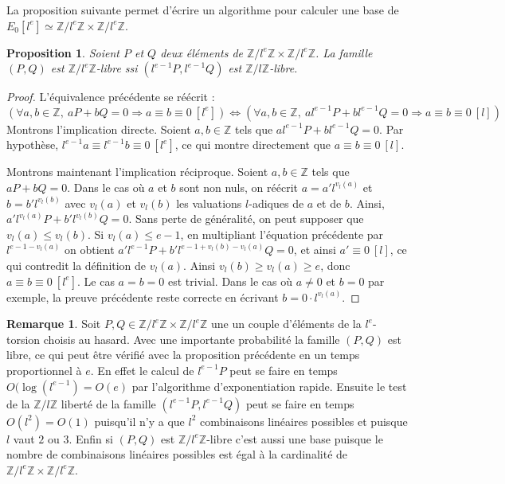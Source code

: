 \documentclass{article}
\theoremstyle{plain}%
\newtheorem{prop}[thm]{Proposition}
\theoremstyle{definition}%
\newtheorem{rem}[thm]{Remarque}
\newcommand{\Z}{\mathbb{Z}}
\begin{document}
La proposition suivante permet d'écrire un algorithme pour calculer une base de 
  $E_0[l^e] \simeq \Z/l^e\Z \times \Z/l^e\Z$.

\begin{prop}
  Soient $P$ et $Q$ deux éléments de $\Z/l^e\Z \times \Z/l^e\Z$. 
  La famille $(P, Q)$ est $\Z/l^e\Z $-libre ssi $(l^{e-1}P, l^{e-1}Q)$ est $\Z/l\Z $-libre. 
\end{prop}

\begin{proof}
  L'équivalence précédente se réécrit :
  $$\left( \forall a, b \in \Z,\ aP + bQ = 0 \Rightarrow a \equiv b \equiv 0\ [l^e] \right) \iff \left( \forall a, b \in \Z,\ a l^{e-1}P + b l^{e-1}Q = 0 \Rightarrow a \equiv b \equiv 0\ [l] \right) $$
  Montrons l'implication directe. Soient $a, b\in \Z$ tels que $a l^{e-1}P + b l^{e-1}Q = 0$. 
  Par hypothèse, $l^{e-1}a \equiv l^{e-1}b \equiv 0\ [l^e]$, ce qui montre directement que $a \equiv b \equiv 0\ [l]$. 

  Montrons maintenant l'implication réciproque. Soient $a, b \in \Z$ tels que $aP + bQ = 0$. 
  Dans le cas où $a$ et $b$ sont non nuls, on réécrit $a = a' l^{v_l(a)}$ et $b = b' l^{v_l(b)}$ avec $v_l(a)$ et $v_l(b)$ les valuations $l$-adiques de $a$ et de $b$. 
  Ainsi, $a' l^{v_l(a)}P + b' l^{v_l(b)}Q = 0$. 
  Sans perte de généralité, on peut supposer que $v_l(a) \le v_l(b)$. 
  Si $v_l(a) \le e-1$, en multipliant l'équation précédente par $l^{e-1-v_l(a)}$ on obtient $a' l^{e-1}P + b' l^{e-1 + v_l(b) - v_l(a)}Q = 0$, et ainsi $a' \equiv 0\ [l]$, ce qui contredit la définition de $v_l(a)$. 
  Ainsi $v_l(b) \ge v_l(a) \ge e$, donc $a \equiv b \equiv 0\ [l^e]$. Le cas $a=b=0$ est trivial. Dans le cas où $a\neq0$ et $b=0$ par exemple, la preuve précédente reste correcte en écrivant $b = 0\cdot l^{v_l(a)}$.
\end{proof}

\begin{rem}
  Soit $P, Q\in \Z/l^e\Z \times \Z/l^e\Z$ une un couple d'éléments de la $l^e$-torsion choisis au hasard. Avec une importante probabilité la famille $(P, Q)$ est libre, ce qui peut être vérifié avec la proposition précédente en un temps proportionnel à $e$. En effet le calcul de $l^{e-1}P$ peut se faire en temps $O(\log(l^{e-1}) = O(e)$ par l'algorithme d'exponentiation rapide. Ensuite le test de la $\Z/l\Z$ liberté de la famille $(l^{e-1}P, l^{e-1}Q)$ peut se faire en temps $O(l^2) = O(1)$ puisqu'il n'y a que $l^2$ combinaisons linéaires possibles et puisque $l$ vaut $2$ ou $3$. Enfin si $(P, Q)$ est $\Z/l^e\Z$-libre c'est aussi une base puisque le nombre de combinaisons linéaires possibles est égal à la cardinalité de $\Z/l^e\Z \times \Z/l^e\Z$.
\end{rem}
\end{document}
